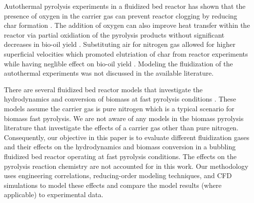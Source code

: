 Autothermal pyrolysis experiments in a fluidized bed reactor has shown that the presence of oxygen in the carrier gas can prevent reactor clogging by reducing char formation \cite{Kim-2014}. The addition of oxygen can also improve heat transfer within the reactor via partial oxidiation of the pyrolysis products without significant decreases in bio-oil yield \cite{Polin-2019a}. Substituting air for nitrogen gas allowed for higher superficial velocities which promoted elutriation of char from reactor experiments while having neglible effect on bio-oil yield \cite{Polin-2019b}. Modeling the fluidization of the autothermal experiments was not discussed in the available literature.

There are several fluidized bed reactor models that investigate the hydrodynamics and conversion of biomass at fast pyrolysis conditions \cite{Papadikis-2009, Papadikis-2010, Mellin-2014, Xiong-2016, Xue-2011}. These models assume the carrier gas is pure nitrogen which is a typical scenario for biomass fast pyrolysis. We are not aware of any models in the biomass pyrolysis literature that investigate the effects of a carrier gas other than pure nitrogen. Consequently, our objective in this paper is to evaluate different fluidization gases and their effects on the hydrodynamics and biomass conversion in a bubbling fluidized bed reactor operating at fast pyrolysis conditions. The effects on the pyrolysis reaction chemistry are not accounted for in this work. Our methodology uses engineering correlations, reducing-order modeling techniques, and CFD simulations to model these effects and compare the model results (where applicable) to experimental data.
